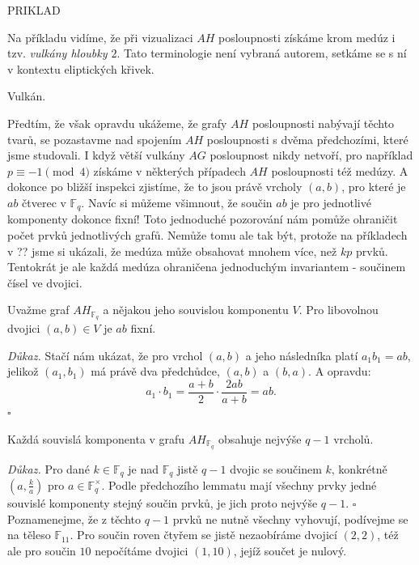 \documentclass[12pt]{report}
\begin{document}
PRIKLAD

Na příkladu vidíme, že při vizualizaci $AH$ posloupnosti získáme krom medúz i tzv. \textit{vulkány hloubky $2$}. Tato terminologie není vybraná autorem, setkáme se s ní v kontextu eliptických křivek.
\begin{definice}
Vulkán.
\end{definice}

Předtím, že však opravdu ukážeme, že grafy $AH$ posloupnosti nabývají těchto tvarů, se pozastavme nad spojením $AH$ posloupnosti s dvěma předchozími, které jsme studovali. I když větší vulkány $AG$ posloupnost nikdy netvoří, pro například $p \equiv -1 \pmod{4}$ získáme v některých případech $AH$ posloupnosti též medúzy. A dokonce po bližší inspekci zjistíme, že to jsou právě vrcholy $(a,b)$, pro které je $ab$ čtverec v $\mathbb{F}_q$. Navíc si můžeme všimnout, že součin $ab$ je pro jednotlivé komponenty dokonce fixní! Toto jednoduché pozorování nám pomůže ohraničit počet prvků jednotlivých grafů.
Nemůže tomu ale tak být, protože na příkladech v ?? jsme si ukázali, že medúza může obsahovat mnohem více, než $k p$ prvků. Tentokrát je ale každá medúza ohraničena jednoduchým invariantem - součinem čísel ve dvojici.

\begin{lemma}
Uvažme graf $AH_{\mathbb{F}_q}$ a nějakou jeho souvislou komponentu $V$. Pro libovolnou dvojici $(a,b) \in V$ je $ab$ fixní.
\end{lemma}
\noindent \textit{Důkaz.} Stačí nám ukázat, že pro vrchol $(a,b)$ a jeho následníka platí $a_1 b_1 = ab$, jelikož $(a_1,b_1)$ má právě dva předchůdce, $(a,b)$ a $(b,a)$. A opravdu:
\begin{equation*}
a_1 \cdot b_1 = \frac{a+b}{2} \cdot \frac{2ab}{a+b} = ab.
\end{equation*} 
\hfill $\square$\\

\begin{dusledek}\label{fixab}
Každá souvislá komponenta v grafu $AH_{\mathbb{F}_q}$ obsahuje nejvýše $q-1$ vrcholů.
\end{dusledek}
\noindent \textit{Důkaz.} Pro dané $k \in \mathbb{F}_q$ je nad $\mathbb{F}_q$ jistě $q-1$ dvojic se součinem $k$, konkrétně $\left(a, \frac{k}{a}\right)$ pro $a \in \mathbb{F}_q ^{\times}$. Podle předchozího lemmatu mají všechny prvky jedné souvislé komponenty stejný součin prvků, je jich proto nejvýše $q-1$. \hfill $\square$\\

Poznamenejme, že z těchto $q-1$ prvků ne nutně všechny vyhovují, podívejme se na těleso $\mathbb{F}_{11}$. Pro součin roven čtyřem se jistě nezaobíráme dvojicí $(2,2)$, též ale pro součin $10$ nepočítáme dvojici $(1,10)$, jejíž součet je nulový.
\end{document}
